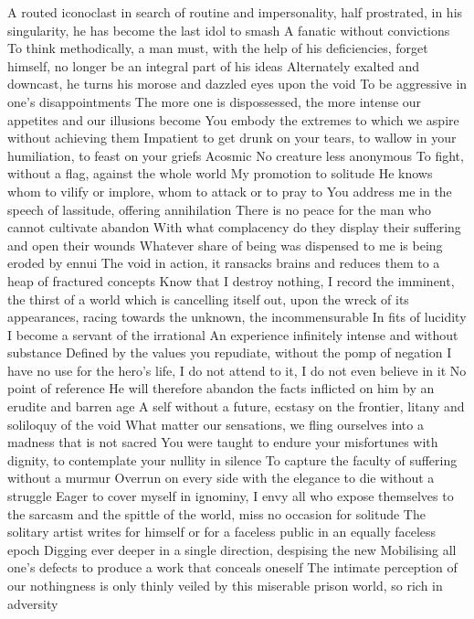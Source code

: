 \documentclass{article}
\begin{document}
A routed iconoclast in search of routine and impersonality, half prostrated, in his singularity, he has become the last idol to smash
A fanatic without convictions
To think methodically, a man must, with the help of his deficiencies, forget himself, no longer be an integral part of his ideas
Alternately exalted and downcast, he turns his morose and dazzled eyes upon the void
To be aggressive in one's disappointments
The more one is dispossessed, the more intense our appetites and our illusions become
You embody the extremes to which we aspire without achieving them
Impatient to get drunk on your tears, to wallow in your humiliation, to feast on your griefs
Acosmic
No creature less anonymous
To fight, without a flag, against the whole world
My promotion to solitude
He knows whom to vilify or implore, whom to attack or to pray to
You address me in the speech of lassitude, offering annihilation
There is no peace for the man who cannot cultivate abandon
With what complacency do they display their suffering and open their wounds
Whatever share of being was dispensed to me is being eroded by ennui
The void in action, it ransacks brains and reduces them to a heap of fractured concepts
Know that I destroy nothing, I record the imminent, the thirst of a world which is cancelling itself out, upon the wreck of its appearances, racing towards the unknown, the incommensurable
In fits of lucidity I become a servant of the irrational
An experience infinitely intense and without substance
Defined by the values you repudiate, without the pomp of negation
I have no use for the hero's life, I do not attend to it, I do not even believe in it
No point of reference
He will therefore abandon the facts inflicted on him by an erudite and barren age
A self without a future, ecstasy on the frontier, litany and soliloquy of the void
What matter our sensations, we fling ourselves into a madness that is not sacred
You were taught to endure your misfortunes with dignity, to contemplate your nullity in silence
To capture the faculty of suffering without a murmur
Overrun on every side with the elegance to die without a struggle
Eager to cover myself in ignominy, I envy all who expose themselves to the sarcasm and the spittle of the world, miss no occasion for solitude
The solitary artist writes for himself or for a faceless public in an equally faceless epoch
Digging ever deeper in a single direction, despising the new
Mobilising all one's defects to produce a work that conceals oneself
The intimate perception of our nothingness is only thinly veiled by this miserable prison world, so rich in adversity
\end{document}
